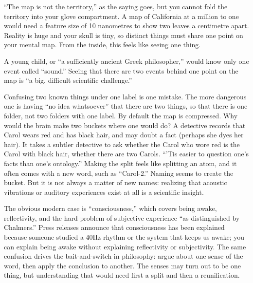 
``The map is not the territory,'' as the saying goes, but you cannot fold the territory into your glove compartment. A map of California at a million to one would need a feature size of 10 nanometres to show two leaves a centimetre apart. Reality is huge and your skull is tiny, so distinct things must share one point on your mental map. From the inside, this feels like seeing one thing.

A young child, or ``a sufficiently ancient Greek philosopher,'' would know only one event called ``sound.''  Seeing that there are two events behind one point on the map is ``a big, difficult scientific challenge.''

Confusing two known things under one label is one mistake. The more dangerous one is having ``no idea whatsoever'' that there are two things, so that there is one folder, not two folders with one label. By default the map is compressed. Why would the brain make two buckets where one would do? A detective records that Carol wears red and has black hair, and may doubt a fact (perhaps she dyes her hair). It takes a subtler detective to ask whether the Carol who wore red is the Carol with black hair, whether there are two Carols. ``'Tis easier to question one's facts than one's ontology.'' Making the split feels like splitting an atom, and it often comes with a new word, such as ``Carol-2.'' Naming seems to create the bucket. But it is not always a matter of new names: realizing that acoustic vibrations or auditory experiences exist at all is a scientific insight.

The obvious modern case is ``consciousness,'' which covers being awake, reflectivity, and the hard problem of subjective experience ``as distinguished by Chalmers.'' Press releases announce that consciousness has been explained because someone studied a 40Hz rhythm or the system that keeps us awake; you can explain being awake without explaining reflectivity or subjectivity. The same confusion drives the bait-and-switch in philosophy: argue about one sense of the word, then apply the conclusion to another. The senses may turn out to be one thing, but understanding that would need first a split and then a reunification. 

